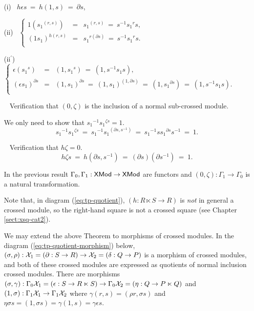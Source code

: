\begin{pf}
\bigskip
(i)~ $h \epsilon s ~=~ h(1,s) ~=~ \partial s$,

\bigskip
(ii)~ 
$\left\{ 
\begin{array}{rcl}
1({s_1}^{(r,s)}) & = & 
{s_1}^{(r,s)} ~=~ s^{-1}{s_1}^rs, \\
(1s_1)^{h(r,s)} & = &
{s_1}^{r(\partial s)} ~=~ 
s^{-1}{s_1}^rs. \\
\end{array}\right.$

\bigskip
(ii$^{\prime}$)~ 
$\left\{ 
\begin{array}{rcl}
\epsilon({s_1}^s) & = & 
(1,{s_1}^s) ~=~ (1,s^{-1}s_1s), \\
(\epsilon s_1)^{\partial s} & = &
(1,s_1)^{\partial s} ~=~ 
(1,s_1)^{(1, \partial s)} ~=~ (1,{s_1}^{\partial s})~=~
(1, s^{-1}s_1s). \\
\end{array}\right.$

\bigskip{}~ 
Verification that $(0,\zeta)$ is the inclusion of a normal sub-crossed module.

\bigskip\noindent
We only need to show that ${s_1}^{-1} {s_1}^{\zeta s} = 1$.
$$
{s_1}^{-1} {s_1}^{\zeta s} ~=~
{s_1}^{-1} {s_1}^{(\partial s, s^{-1})} ~=~
{s_1}^{-1} s {s_1}^{\partial s} s^{-1} ~=~ 1.
$$

\bigskip{}~ 
Verification that $h\zeta = 0$.
$$
h \zeta s ~=~ h(\partial s, s^{-1}) ~=~ (\partial s)(\partial s^{-1}) ~=~ 1.
$$
\end{pf}

\begin{cor}
In the previous result $\Gamma_0, \Gamma_1 : {{\sf XMod}} \to {{\sf XMod}}$ are functors
and $(0,\zeta) : \Gamma_1 \to \Gamma_0$ is a natural transformation.
\end{cor}

Note that, in diagram (\ref{eq:tp-quotient}),  
$(h : R \ltimes S \to R)$ is \emph{not} in general a crossed module,
so the right-hand square is not a crossed square 
(see Chapter \ref{sect:xsq-cat2}).

\bigskip
We may extend the above Theorem to morphisms of crossed modules. 
In the diagram (\ref{eq:tp-quotient-morphism}) below, 
$(\sigma,\rho) : \mathcal{X}_1 
 = (\partial : S \to R) \to \mathcal{X}_2 = (\delta : Q \to P)$ 
is a morphism of crossed modules, 
and both of these crossed modules are expressed as quotients of 
normal inclusion crossed modules. 
There are morphisms 
$(\sigma,\gamma) : \Gamma_0\mathcal{X}_1 = (\epsilon : S \to R \ltimes S) 
 \to \Gamma_0\mathcal{X}_2 = (\eta : Q \to P \ltimes Q)$ 
and $(1,\sigma) : \Gamma_1\mathcal{X}_1 \to \Gamma_1\mathcal{X}_2$ 
where $\gamma(r,s) = (\rho r, \sigma s)$ and 
$\eta\sigma s = (1,\sigma s) = \gamma(1,s) = \gamma\epsilon s$. 

